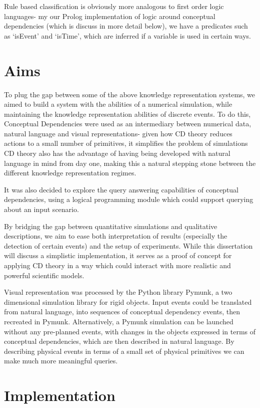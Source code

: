 \documentclass[12pt,MSc,wordcount,twoside]{muthesis}
\begin{document}
    Rule based classification is obviously more analogous to first order logic languages- my our Prolog implementation of logic around conceptual dependencies (which is discuss in more detail below), we have a predicates such as `isEvent' and `isTime', which are inferred if a variable is used in certain ways.

    \section{Aims}
    To plug the gap between some of the above knowledge representation systems, we aimed to build a system with the abilities of a numerical simulation, while maintaining the knowledge representation abilities of discrete events. To do this, Conceptual Dependencies were used as an intermediary between numerical data, natural language and visual representations- given how CD theory reduces actions to a small number of primitives, it simplifies the problem of simulations CD theory also has the advantage of having being developed with natural language in mind from day one, making this a natural stepping stone between the different knowledge representation regimes.

    It was also decided to explore the query answering capabilities of conceptual dependencies, using a logical programming module which could support querying about an input scenario.

    By bridging the gap between quantitative simulations and qualitative descriptions, we aim to ease both interpretation of results (especially the detection of certain events) and the setup of experiments. While this dissertation will discuss a simplistic implementation, it serves as a proof of concept for applying CD theory in a way which could interact with more realistic and powerful scientific models.

    Visual representation was processed by the Python library Pymunk, a two dimensional simulation library for rigid objects. Input events could be translated from natural language, into sequences of conceptual dependency events, then recreated in Pymunk. Alternatively, a Pymunk simulation can be launched without any pre-planned events, with changes in the objects expressed in terms of conceptual dependencies, which are then described in natural language. By describing physical events in terms of a small set of physical primitives we can make much more meaningful queries.



    \section{Implementation}
    
\end{document}
